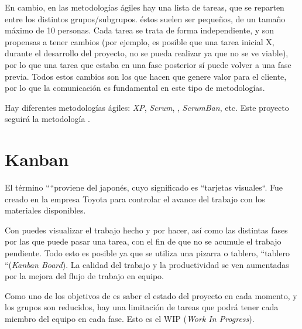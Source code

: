 	
	En cambio, en las metodolog\'ias \'agiles hay una lista de tareas, que se reparten entre los distintos grupos/subgrupos. \'estos suelen ser peque\~{n}os, de un tama\~{n}o m\'aximo de 10 personas. Cada tarea se trata de forma independiente, y son propensas a tener cambios (por ejemplo, es posible que una tarea inicial X, durante el desarrollo del proyecto, no se pueda realizar ya que no se ve viable), por lo que una tarea que estaba en una fase posterior s\'i puede volver a una fase previa. Todos estos cambios son los que hacen que genere valor para el cliente, por lo que la comunicaci\'on es fundamental en este tipo de metodolog\'ias.
	
	
	Hay diferentes metodolog\'ias \'agiles: \textit{XP}, \textit{Scrum}, \kanban, \textit{ScrumBan}, etc. Este proyecto seguir\'a la metodolog\'ia \kanban.


\section{Kanban}
\label{cap3:sec:kanban}

	El t\'ermino ``\kanban``\space proviene del japon\'es, cuyo significado es ``tarjetas visuales``. Fue creado en la empresa Toyota para controlar el avance del trabajo con los materiales disponibles.
	
	Con \kanban \space puedes visualizar el trabajo hecho y por hacer, as\'i como las distintas fases por las que puede pasar una tarea, con el fin de que no se acumule el trabajo pendiente. Todo esto es posible ya que se utiliza una pizarra o tablero, ``tablero \kanban``\space (\textit{Kanban Board}). La calidad del trabajo y la productividad se ven aumentadas por la mejora del flujo de trabajo en equipo.
	
	Como uno de los objetivos de \kanban \space es saber el estado del proyecto en cada momento, y los grupos son reducidos, hay una limitaci\'on de tareas que podr\'a tener cada miembro del equipo en cada fase. Esto es el WIP (\textit{Work In Progress}).

